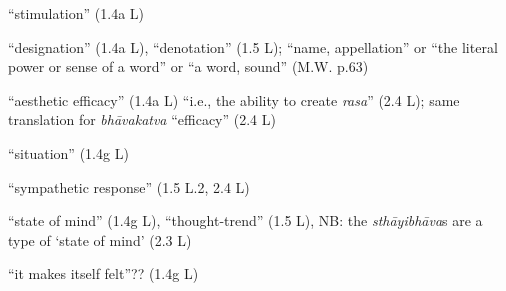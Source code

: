 \documentclass[10pt]{article}
\begin{document}
\begin{multicols}{2}
\begin{enumerate}[
			leftmargin=0em,
			rightmargin=0em,
		]


		 ``stimulation'' (1.4a L)

		 ``designation'' (1.4a L),
		``denotation'' (1.5 L);
		``name, appellation'' or
		``the literal power or sense of a word'' or
		``a word, sound'' (M.W. p.63)

		 ``aesthetic efficacy'' (1.4a L)
		``i.e., the ability to create \textit{rasa}'' (2.4 L);
		same translation for \textit{bhāvakatva} ``efficacy'' (2.4 L) %

		 ``situation'' (1.4g L)



		 ``sympathetic response'' (1.5 L.2, 2.4 L)



		 ``state of mind'' (1.4g L),
		``thought-trend'' (1.5 L), %
		NB: the \textit{sthāyibhāva}s are a type of `state of mind' (2.3 L)

		 ``it makes itself felt''?? (1.4g L)


\end{enumerate}
\end{multicols}
\end{document}
